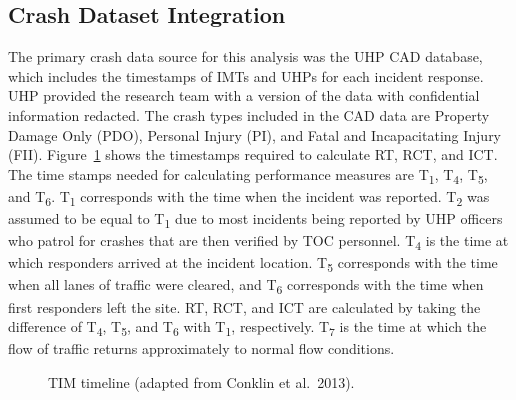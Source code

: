 \documentclass[
  letterpaper,
  authoryear]{elsarticle}
\begin{document}
\subsection{Crash Dataset Integration}\label{crash-dataset-integration}

The primary crash data source for this analysis was the UHP CAD
database, which includes the timestamps of IMTs and UHPs for each
incident response. UHP provided the research team with a version of the
data with confidential information redacted. The crash types included in
the CAD data are Property Damage Only (PDO), Personal Injury (PI), and
Fatal and Incapacitating Injury (FII). Figure~\ref{fig-TIM_Timeline}
shows the timestamps required to calculate RT, RCT, and ICT. The time
stamps needed for calculating performance measures are
T\textsubscript{1}, T\textsubscript{4}, T\textsubscript{5}, and
T\textsubscript{6}. T\textsubscript{1} corresponds with the time when
the incident was reported. T\textsubscript{2} was assumed to be equal to
T\textsubscript{1} due to most incidents being reported by UHP officers
who patrol for crashes that are then verified by TOC personnel.
T\textsubscript{4} is the time at which responders arrived at the
incident location. T\textsubscript{5} corresponds with the time when all
lanes of traffic were cleared, and T\textsubscript{6} corresponds with
the time when first responders left the site. RT, RCT, and ICT are
calculated by taking the difference of T\textsubscript{4},
T\textsubscript{5}, and T\textsubscript{6} with T\textsubscript{1},
respectively. T\textsubscript{7} is the time at which the flow of
traffic returns approximately to normal flow conditions.

\begin{figure}


\caption{\label{fig-TIM_Timeline}TIM timeline (adapted from Conklin et
al.~2013).}

\end{figure}%
\end{document}
